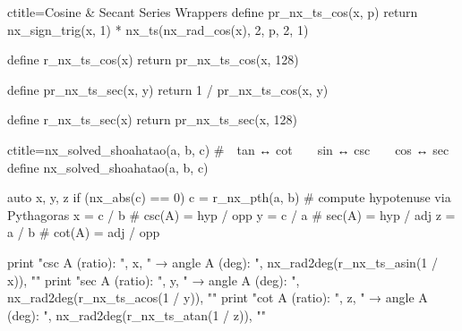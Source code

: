 \begin{NxLightListBox}[title={Tangent Symmetry — The Identity Glyph}]
\end{NxLightListBox}

\begin{NxCodeBox}{c}{title={Cosine \& Secant Series Wrappers}}
define pr_nx_ts_cos(x, p) {
    return nx_sign_trig(x, 1) * nx_ts(nx_rad_cos(x), 2, p, 2, 1)
}

define r_nx_ts_cos(x) {
    return pr_nx_ts_cos(x, 128)
}

define pr_nx_ts_sec(x, y) {
    return 1 / pr_nx_ts_cos(x, y)
}

define r_nx_ts_sec(x) {
    return pr_nx_ts_sec(x, 128)
}
\end{NxCodeBox}

\begin{NxCodeBox}{c}{title={nx\_solved\_shoahatao(a, b, c)}}
# tan ↔ cot  sin ↔ csc  cos ↔ sec
define nx_solved_shoahatao(a, b, c) {
    auto x, y, z
    if (nx_abs(c) == 0)
        c = r_nx_pth(a, b) # compute hypotenuse via Pythagoras
    x = c / b              # csc(A) = hyp / opp
    y = c / a              # sec(A) = hyp / adj
    z = a / b              # cot(A) = adj / opp

    print "csc A (ratio): ", x, " → angle A (deg): ", nx_rad2deg(r_nx_ts_asin(1 / x)), "\n"
    print "sec A (ratio): ", y, " → angle A (deg): ", nx_rad2deg(r_nx_ts_acos(1 / y)), "\n"
    print "cot A (ratio): ", z, " → angle A (deg): ", nx_rad2deg(r_nx_ts_atan(1 / z)), "\n"
}
\end{NxCodeBox}

\begin{NxLightListBox}[title={Reciprocal Trig Solver — The Inverse Glyph}]
\end{NxLightListBox}

